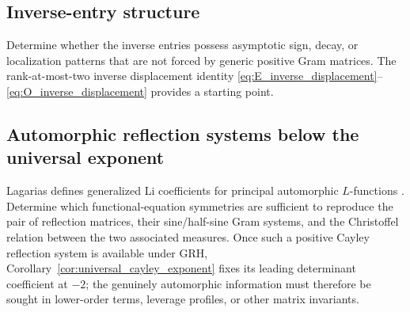 \documentclass[11pt]{amsart}
\numberwithin{equation}{section}
\theoremstyle{plain}
\theoremstyle{definition}
\theoremstyle{remark}
\begin{document}
\subsection{Inverse-entry structure}
\label{ques:inverse_entries}
Determine whether the inverse entries possess asymptotic sign, decay, or localization
patterns that are not forced by generic positive Gram matrices.  The rank-at-most-two
inverse displacement identity \eqref{eq:E_inverse_displacement}--\eqref{eq:O_inverse_displacement}
provides a starting point.

\subsection{Automorphic reflection systems below the universal exponent}
\label{ques:automorphic_extension}
Lagarias defines generalized Li coefficients for principal automorphic $L$-functions
\cite{Lagarias2007}.  Determine which functional-equation symmetries are sufficient to
reproduce the pair of reflection matrices, their sine/half-sine Gram systems, and the
Christoffel relation between the two associated measures.  Once such a positive Cayley
reflection system is available under GRH, Corollary~\ref{cor:universal_cayley_exponent}
fixes its leading determinant coefficient at $-2$; the genuinely automorphic information
must therefore be sought in lower-order terms, leverage profiles, or other matrix
invariants.
\end{document}
